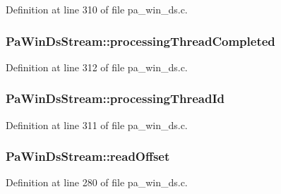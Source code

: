 Definition at line 310 of file pa\+\_\+win\+\_\+ds.\+c.

\subsubsection[{\texorpdfstring{processing\+Thread\+Completed}{processingThreadCompleted}}]{ Pa\+Win\+Ds\+Stream\+::processing\+Thread\+Completed}\hypertarget{struct_pa_win_ds_stream_a87d6c1cfc09893482fa97c532754c3d6}{}\label{struct_pa_win_ds_stream_a87d6c1cfc09893482fa97c532754c3d6}


Definition at line 312 of file pa\+\_\+win\+\_\+ds.\+c.

\subsubsection[{\texorpdfstring{processing\+Thread\+Id}{processingThreadId}}]{ Pa\+Win\+Ds\+Stream\+::processing\+Thread\+Id}\hypertarget{struct_pa_win_ds_stream_ae723b0812bffda1934c9334e0b81c2a2}{}\label{struct_pa_win_ds_stream_ae723b0812bffda1934c9334e0b81c2a2}


Definition at line 311 of file pa\+\_\+win\+\_\+ds.\+c.

\subsubsection[{\texorpdfstring{read\+Offset}{readOffset}}]{ Pa\+Win\+Ds\+Stream\+::read\+Offset}\hypertarget{struct_pa_win_ds_stream_a0079b8e85936fe109614a93943944cf0}{}\label{struct_pa_win_ds_stream_a0079b8e85936fe109614a93943944cf0}


Definition at line 280 of file pa\+\_\+win\+\_\+ds.\+c.

